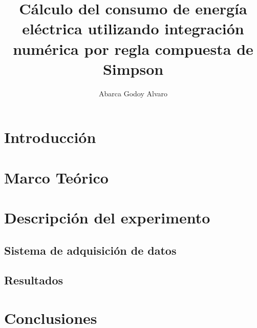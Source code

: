 
\usepackage{lipsum}

\title{Cálculo del consumo de energía eléctrica utilizando integración numérica por regla compuesta de Simpson}
\author{Abarca Godoy Alvaro}
\def\grupo{5NV50}
\def\asignatura{Métodos Numéricos}
\def\docente{Docente}
\def\fechaEntrega{25 de junio del 2024}





\tableofcontents

\newpage

\section{Introducción}

%
\section{Marco Teórico}


\section{Descripción del experimento}
%
%
\subsection{Sistema de adquisición de datos}
\subsection{Resultados}

\section{Conclusiones}
%

\newpage



